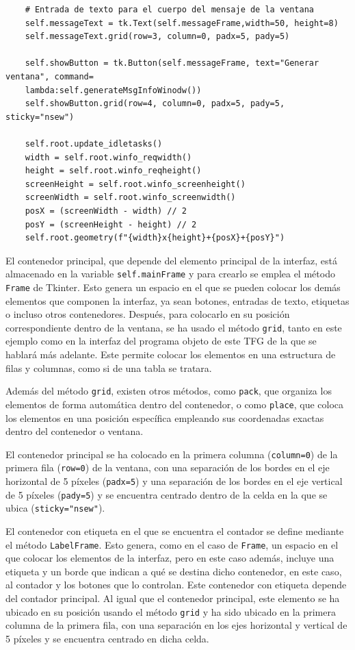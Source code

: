 \begin{lstlisting}
    # Entrada de texto para el cuerpo del mensaje de la ventana
    self.messageText = tk.Text(self.messageFrame,width=50, height=8)
    self.messageText.grid(row=3, column=0, padx=5, pady=5)

    self.showButton = tk.Button(self.messageFrame, text="Generar ventana", command=
    lambda:self.generateMsgInfoWinodw())
    self.showButton.grid(row=4, column=0, padx=5, pady=5, sticky="nsew")

    self.root.update_idletasks()
    width = self.root.winfo_reqwidth()
    height = self.root.winfo_reqheight()
    screenHeight = self.root.winfo_screenheight()
    screenWidth = self.root.winfo_screenwidth()
    posX = (screenWidth - width) // 2
    posY = (screenHeight - height) // 2
    self.root.geometry(f"{width}x{height}+{posX}+{posY}")
\end{lstlisting}

El contenedor principal, que depende del elemento principal de la interfaz, está almacenado en la variable \texttt{self.mainFrame} y para crearlo se emplea el método \texttt{Frame} de Tkinter. Esto genera un espacio en el que se pueden colocar los demás elementos que componen la interfaz, ya sean botones, entradas de texto, etiquetas o incluso otros contenedores. Después, para colocarlo en su posición correspondiente dentro de la ventana, se ha usado el método \texttt{grid}, tanto en este ejemplo como en la interfaz del programa objeto de este \acrshort{TFG} de la que se hablará más adelante. Este permite colocar los elementos en una estructura de filas y columnas, como si de una tabla se tratara.

Además del método \texttt{grid}, existen otros métodos, como \texttt{pack}, que organiza los elementos de forma automática dentro del contenedor, o como \texttt{place}, que coloca los elementos en una posición específica empleando sus coordenadas exactas dentro del contenedor o ventana.

El contenedor principal se ha colocado en la primera columna (\texttt{column=0}) de la primera fila (\texttt{row=0}) de la ventana, con una separación de los bordes en el eje horizontal de 5 píxeles (\texttt{padx=5}) y una separación de los bordes en el eje vertical de 5 píxeles (\texttt{pady=5}) y se encuentra centrado dentro de la celda en la que se ubica (\texttt{sticky="nsew"}).

El contenedor con etiqueta en el que se encuentra el contador se define mediante el método \texttt{LabelFrame}. Esto genera, como en el caso de \texttt{Frame}, un espacio en el que colocar los elementos de la interfaz, pero en este caso además, incluye una etiqueta y un borde que indican a qué se destina dicho contenedor, en este caso,  al contador y los botones que lo controlan. Este contenedor con etiqueta depende del contador principal. Al igual que el contenedor principal, este elemento se ha ubicado en su posición usando el método \texttt{grid} y ha sido ubicado en la primera columna de la primera fila, con una separación en los ejes horizontal y vertical de 5 píxeles y se encuentra centrado en dicha celda. 

